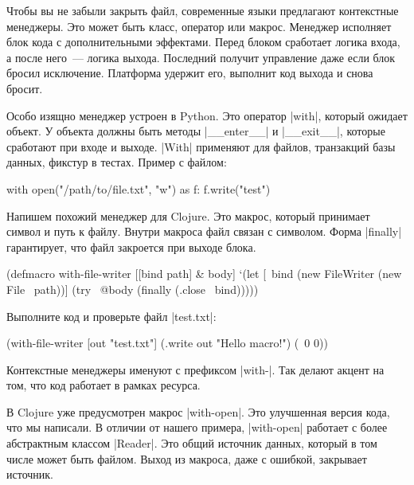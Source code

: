 Чтобы вы не забыли закрыть файл, современные языки предлагают контекстные
менеджеры. Это может быть класс, оператор или макрос. Менеджер исполняет блок
кода с дополнительными эффектами. Перед блоком сработает логика входа, а после
него~--- логика выхода. Последний получит управление даже если блок бросил
исключение. Платформа удержит его, выполнит код выхода и снова бросит.

Особо изящно менеджер устроен в Python. Это оператор \spverb|with|, который
ожидает объект. У объекта должны быть методы \spverb|__enter__| и
\spverb|__exit__|, которые сработают при входе и выходе. \spverb|With| применяют
для файлов, транзакций базы данных, фикстур в тестах. Пример с файлом:

\begin{english}
  \begin{python}
with open("/path/to/file.txt", "w") as f:
    f.write("test")
  \end{python}
\end{english}

Напишем похожий менеджер для Clojure. Это макрос, который принимает символ и
путь к файлу. Внутри макроса файл связан с символом. Форма \spverb|finally|
гарантирует, что файл закроется при выходе блока.

\begin{english}
  \begin{clojure}
(defmacro with-file-writer
  [[bind path] & body]
  `(let [~bind (new FileWriter (new File ~path))]
     (try
       ~@body
       (finally
         (.close ~bind)))))
  \end{clojure}
\end{english}

\noindent
Выполните код и проверьте файл \spverb|test.txt|:

\begin{english}
  \begin{clojure}
(with-file-writer [out "test.txt"]
  (.write out "Hello macro!")
  (\ 0 0))
  \end{clojure}
\end{english}

Контекстные менеджеры именуют с префиксом \spverb|with-|. Так делают акцент на
том, что код работает в рамках ресурса.

В Clojure уже предусмотрен макрос \spverb|with-open|. Это улучшенная версия
кода, что мы написали. В отличии от нашего примера, \spverb|with-open| работает
с более абстрактным классом \spverb|Reader|. Это общий источник данных, который
в том числе может быть файлом. Выход из макроса, даже с ошибкой, закрывает
источник.

